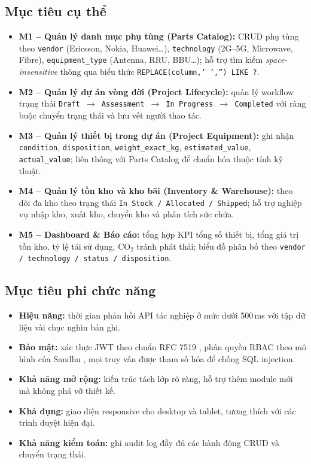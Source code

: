 \subsection{Mục tiêu cụ thể}
\begin{itemize}[leftmargin=1.2cm]
    \item \textbf{M1 -- Quản lý danh mục phụ tùng (Parts Catalog):} CRUD phụ tùng theo \texttt{vendor} (Ericsson, Nokia, Huawei\dots), \texttt{technology} (2G--5G, Microwave, Fibre), \texttt{equipment\_type} (Antenna, RRU, BBU\dots); hỗ trợ tìm kiếm \emph{space-insensitive} thông qua biểu thức \texttt{REPLACE(column,' ','') LIKE ?}.
    \item \textbf{M2 -- Quản lý dự án vòng đời (Project Lifecycle):} quản lý workflow trạng thái \texttt{Draft $\rightarrow$ Assessment $\rightarrow$ In Progress $\rightarrow$ Completed} với ràng buộc chuyển trạng thái và lưu vết người thao tác.
    \item \textbf{M3 -- Quản lý thiết bị trong dự án (Project Equipment):} ghi nhận \texttt{condition}, \texttt{disposition}, \texttt{weight\_exact\_kg}, \texttt{estimated\_value}, \texttt{actual\_value}; liên thông với Parts Catalog để chuẩn hóa thuộc tính kỹ thuật.
    \item \textbf{M4 -- Quản lý tồn kho và kho bãi (Inventory \& Warehouse):} theo dõi đa kho theo trạng thái \texttt{In Stock / Allocated / Shipped}; hỗ trợ nghiệp vụ nhập kho, xuất kho, chuyển kho và phân tích sức chứa.
    \item \textbf{M5 -- Dashboard \& Báo cáo:} tổng hợp KPI tổng số thiết bị, tổng giá trị tồn kho, tỷ lệ tái sử dụng, CO$_2$ tránh phát thải; biểu đồ phân bố theo \texttt{vendor / technology / status / disposition}.
\end{itemize}

\subsection{Mục tiêu phi chức năng}
\begin{itemize}[leftmargin=1.2cm]
    \item \textbf{Hiệu năng:} thời gian phản hồi API tác nghiệp ở mức dưới 500\,ms với tập dữ liệu vài chục nghìn bản ghi.
    \item \textbf{Bảo mật:} xác thực JWT theo chuẩn RFC 7519 \cite{rfc7519}, phân quyền RBAC theo mô hình của Sandhu \cite{sandhu1996rbac}, mọi truy vấn được tham số hóa để chống SQL injection.
    \item \textbf{Khả năng mở rộng:} kiến trúc tách lớp rõ ràng, hỗ trợ thêm module mới mà không phá vỡ thiết kế.
    \item \textbf{Khả dụng:} giao diện responsive cho desktop và tablet, tương thích với các trình duyệt hiện đại.
    \item \textbf{Khả năng kiểm toán:} ghi audit log đầy đủ các hành động CRUD và chuyển trạng thái.
\end{itemize}


